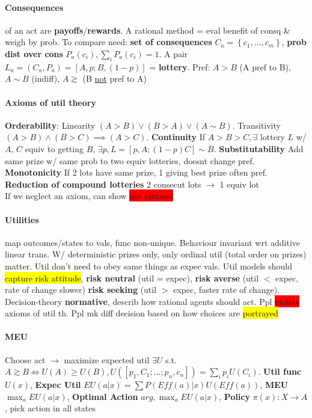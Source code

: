 \paragraph{Consequences} of an act are
\textbf{payoffs}/\textbf{rewards}. A rational method = eval benefit of
consq \& weigh by prob. To compare need: \textbf{set of consequences}
$C_a = \left\{c_1,\ldots,c_m\right\}$, \textbf{prob dist over cons}
$P_a(c_i), \sum_i P_a (c_i)=1$. A pair $L_a = (C_a, P_a)=[A,p; B, (1-p)]$ =
\textbf{lottery}. Pref: $A>B$ (A pref to B), $A\sim B$ (indiff), $A
\gtrsim$ (B \underline{not} pref to A)
\paragraph{Axioms of util theory}
\textbf{Orderability}: Linearity $(A>B)\lor (B>A) \lor (A \sim
B)$. Transitivity $(A>B)\land (B>C) \implies
(A>C)$. \textbf{Continuity} If $A>B>C, \exists $ lottery $L$ w/ $A$,
$C$ equiv to getting $B$, $\exists p, L = [p,A;(1-p) C]\sim
B$. \textbf{Substitutability} Add same prize w/ same prob to two equiv
lotteries, doesnt change pref. \textbf{Monotonicity} If 2 lots have
same prize, 1 giving best prize often pref. \textbf{Reduction of
  compound lotteries} 2 consecut lots $\to$ 1 equiv lot
\\ If we neglect an axiom, can show \colorbox{red}{not rational}
\paragraph{Utilities} map outcomes/states to vals, func
non-unique. Behaviour invariant wrt additive linear trans. W/
deterministic prizes only, only ordinal util (total order on prizes)
matter. Util don't need to obey same things as expec vals. Util models
should \colorbox{yellow}{capture risk attitude}, \textbf{risk neutral}
(util = expec), \textbf{risk averse} (util $<$ expec, rate of change slower) \textbf{risk
  seeking} (util $>$ expec, faster rate of change).
\\ Decision-theory \textbf{normative}, describ how rational agents
should act. Ppl \colorbox{red}{violate} axioms of util th. Ppl mk
diff decision based on how choices are \colorbox{yellow}{portrayed}
\paragraph{MEU} Choose act $\to$ maximize expected util
$\exists U$ s.t. $A \gtrsim B \iff U(A)\geq U(B),
U([p_1,C_1;\ldots;p_n,c_n]) = \sum_i p_i U(C_i)$. \textbf{Util func}
$U(x)$, \textbf{Expec Util} $EU(a | x) = \sum P(Eff(a)|x)U(Eff(a))$,
\textbf{MEU} $\max_a EU(a|x)$, \textbf{Optimal Action} $arg,\max_a
EU(a|x)$, \textbf{Policy} $\pi(x): X \to A$, pick action in all states
